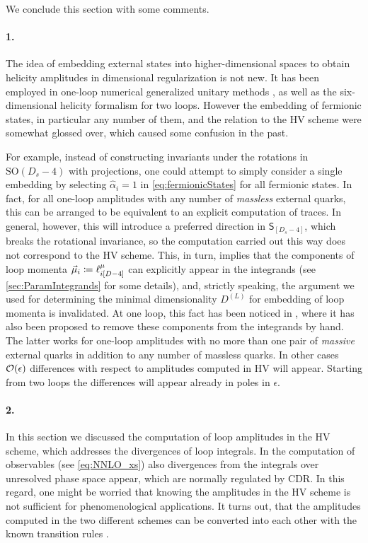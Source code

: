 We conclude this section with some comments.
\paragraph{1.} 
The idea of embedding external states into higher-dimensional spaces to obtain
helicity amplitudes in dimensional regularization is not new. 
It has been employed in one-loop numerical generalized
unitary methods \cite{Ellis:2007br,Giele:2008ve}, as well as 
the six-dimensional helicity formalism \cite{Bern2011,Cheung:2009dc,Badger:2013gxa,Badger:2017jhb} for two loops.
However the embedding of fermionic states, in particular any number of them,
and the relation to the HV scheme were somewhat glossed over,
which caused some confusion in the past.

For example, instead of constructing invariants under the rotations in $\mathrm{SO}(D_s-4)$
with projections, one could attempt to simply consider a single embedding by
selecting $\hat{\alpha}_i=1$ in \cref{eq:fermionicStates} for all fermionic states.
In fact, for all one-loop amplitudes with any number of \emph{massless} external quarks,
this can be arranged \cite{Anger:2018ove}
to be equivalent to an explicit computation of traces.
In general, however, this will introduce a preferred direction in $\mathsf{S}_{[D_s-4]}$,
which breaks the rotational invariance, 
so the computation carried out this way does not correspond to the HV scheme.
This, in turn, implies that the components of loop momenta $\va{\mu}_i \coloneqq \ell^\mu_{i[D-4]}$ can explicitly appear in the integrands (see \cref{sec:ParamIntegrands} for some details),
and, strictly speaking, the argument we used for determining the minimal dimensionality $D^{(L)}$ for embedding of loop momenta is invalidated.
At one loop, this fact has been noticed in \cite{Fazio:2014xea,Badger:2017gta},
where it has also been proposed to remove these components from the integrands by hand.
The latter works for one-loop amplitudes with no more than one pair of \emph{massive} external quarks in addition
to any number of massless quarks.
In other cases $\order{\epsilon}$ differences with respect to amplitudes computed in HV will appear.
Starting from two loops the differences will appear already in poles in $\epsilon$. 

\paragraph{2.}
In this section we discussed the computation of loop amplitudes in the HV scheme, which addresses the divergences of loop integrals.
In the computation of observables (see \cref{eq:NNLO_xs}) also divergences from the integrals over unresolved phase space appear,
which are normally regulated by CDR.
In this regard, one might be worried that knowing the amplitudes in the HV scheme is not sufficient for phenomenological applications.
It turns out, that the amplitudes computed in the two different schemes can be converted into each other with the known transition rules \cite{Broggio:2015dga}.

